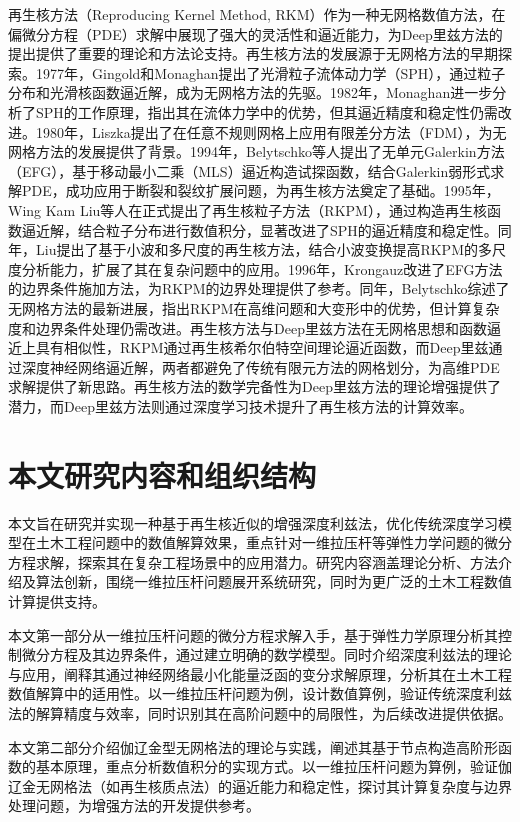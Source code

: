 \documentclass[engineeringmaster]{hquThesis}
\begin{document}
再生核方法（Reproducing Kernel Method, RKM）作为一种无网格数值方法，在偏微分方程（PDE）求解中展现了强大的灵活性和逼近能力，为Deep里兹方法的提出提供了重要的理论和方法论支持。再生核方法的发展源于无网格方法的早期探索。1977年，Gingold和Monaghan提出了光滑粒子流体动力学（SPH），通过粒子分布和光滑核函数逼近解，成为无网格方法的先驱。1982年，Monaghan进一步分析了SPH的工作原理，指出其在流体力学中的优势，但其逼近精度和稳定性仍需改进。1980年，Liszka提出了在任意不规则网格上应用有限差分方法（FDM），为无网格方法的发展提供了背景。1994年，Belytschko等人提出了无单元Galerkin方法（EFG），基于移动最小二乘（MLS）逼近构造试探函数，结合Galerkin弱形式求解PDE，成功应用于断裂和裂纹扩展问题，为再生核方法奠定了基础。1995年，Wing Kam Liu等人在正式提出了再生核粒子方法（RKPM），通过构造再生核函数逼近解，结合粒子分布进行数值积分，显著改进了SPH的逼近精度和稳定性。同年，Liu提出了基于小波和多尺度的再生核方法，结合小波变换提高RKPM的多尺度分析能力，扩展了其在复杂问题中的应用。1996年，Krongauz改进了EFG方法的边界条件施加方法，为RKPM的边界处理提供了参考。同年，Belytschko综述了无网格方法的最新进展，指出RKPM在高维问题和大变形中的优势，但计算复杂度和边界条件处理仍需改进。再生核方法与Deep里兹方法在无网格思想和函数逼近上具有相似性，RKPM通过再生核希尔伯特空间理论逼近函数，而Deep里兹通过深度神经网络逼近解，两者都避免了传统有限元方法的网格划分，为高维PDE求解提供了新思路。再生核方法的数学完备性为Deep里兹方法的理论增强提供了潜力，而Deep里兹方法则通过深度学习技术提升了再生核方法的计算效率。


\section{本文研究内容和组织结构}
本文旨在研究并实现一种基于再生核近似的增强深度利兹法，优化传统深度学习模型在土木工程问题中的数值解算效果，重点针对一维拉压杆等弹性力学问题的微分方程求解，探索其在复杂工程场景中的应用潜力。研究内容涵盖理论分析、方法介绍及算法创新，围绕一维拉压杆问题展开系统研究，同时为更广泛的土木工程数值计算提供支持。

本文第一部分从一维拉压杆问题的微分方程求解入手，基于弹性力学原理分析其控制微分方程及其边界条件，通过建立明确的数学模型。同时介绍深度利兹法的理论与应用，阐释其通过神经网络最小化能量泛函的变分求解原理，分析其在土木工程数值解算中的适用性。以一维拉压杆问题为例，设计数值算例，验证传统深度利兹法的解算精度与效率，同时识别其在高阶问题中的局限性，为后续改进提供依据。

本文第二部分介绍伽辽金型无网格法的理论与实践，阐述其基于节点构造高阶形函数的基本原理，重点分析数值积分的实现方式。以一维拉压杆问题为算例，验证伽辽金无网格法（如再生核质点法）的逼近能力和稳定性，探讨其计算复杂度与边界处理问题，为增强方法的开发提供参考。
\end{document}
